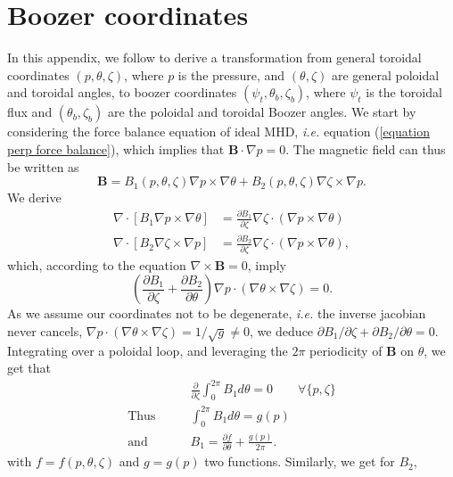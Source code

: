 \chapter{Boozer coordinates}
\label{appendix boozer coordinates}
In this appendix, we follow \citet{Helander2014} to derive a transformation from general toroidal coordinates $(p,\theta,\zeta)$, where $p$ is the pressure, and $(\theta,\zeta)$ are general poloidal and toroidal angles, to boozer coordinates $(\psi_t,\theta_b,\zeta_b)$, where $\psi_t$ is the toroidal flux and $(\theta_b,\zeta_b)$ are the poloidal and toroidal Boozer angles. We start by considering the force balance equation of ideal MHD, \textit{i.e.} equation (\ref{equation perp force balance}), which implies that $\mathbf{B}\cdot\nabla p =0$. The magnetic field can thus be written as
\begin{equation}
	\mathbf{B} = B_1(p,\theta,\zeta)\nabla p\times\nabla\theta + B_2(p,\theta,\zeta)\nabla\zeta\times\nabla p.
\end{equation}
We derive 
\begin{align}
	\nabla\cdot[B_1\nabla p \times\nabla\theta] &= \frac{\partial B_1}{\partial \zeta}\nabla\zeta\cdot(\nabla p \times\nabla\theta)\\
	\nabla\cdot[B_2\nabla\zeta\times\nabla p] &= \frac{\partial B_2}{\partial \zeta}\nabla\zeta\cdot(\nabla p \times\nabla\theta),
\end{align}
which, according to the equation $\nabla\times\mathbf{B}=0$, imply
\begin{equation}
	\left(\frac{\partial B_1}{\partial\zeta}+\frac{\partial B_2}{\partial \theta}\right) \nabla p \cdot(\nabla\theta\times\nabla\zeta)=0.
\end{equation}
As we assume our coordinates not to be degenerate, \textit{i.e.} the inverse jacobian never cancels, $\nabla p \cdot(\nabla\theta\times\nabla\zeta) = 1/\sqrt{g} \neq 0$, we deduce $\partial B_1/\partial\zeta + \partial B_2/\partial\theta =0$. Integrating over a poloidal loop, and leveraging the $2\pi$ periodicity of $\mathbf{B}$ on $\theta$, we get that
\begin{align}
	{}&\frac{\partial}{\partial\zeta} \int_0^{2\pi} B_1d\theta =0\qquad\forall\{p,\zeta\}\\
	\text{Thus}\qquad &\int_0^{2\pi}B_1 d\theta = g(p)\\
	\text{and}\qquad&B_1=\frac{\partial f}{\partial\theta} + \frac{g(p)}{2\pi}.
\end{align}
with $f=f(p,\theta,\zeta)$ and $g=g(p)$ two functions. Similarly, we get for $B_2$,
